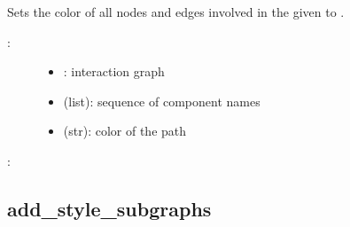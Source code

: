 \documentclass[letterpaper,10pt,english]{sphinxmanual}
\begin{document}
\begin{fulllineitems}
\label{\detokenize{InteractionGraphs:PyBoolNet.InteractionGraphs.add_style_path}}
Sets the color of all nodes and edges involved in the given  to .
\begin{description}
\item[{:}] \leavevmode\begin{itemize}
\item {} 
: interaction graph

\item {} 
 (list): sequence of component names

\item {} 
 (str): color of the path

\end{itemize}

\end{description}

:

\begin{sphinxVerbatim}[commandchars=\\\{\}]
  \PYG{p}{[}  \PYG{p}{]}
  
\end{sphinxVerbatim}

\end{fulllineitems}



\subsection{add\_style\_subgraphs}
\label{\detokenize{InteractionGraphs:add-style-subgraphs}}\label{\detokenize{InteractionGraphs:id16}}
\end{document}
